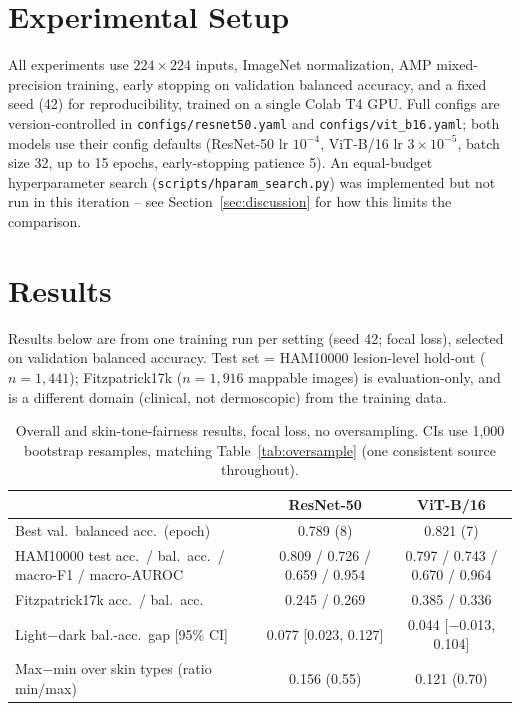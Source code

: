 \documentclass[twoside,a4paper,11pt]{article}
\begin{document}
\section{Experimental Setup}
\label{sec:setup}

All experiments use $224\times224$ inputs, ImageNet normalization,
AMP mixed-precision training, early stopping on validation balanced
accuracy, and a fixed seed (42) for reproducibility, trained on a
single Colab T4 GPU. Full configs are version-controlled in
\texttt{configs/resnet50.yaml} and \texttt{configs/vit\_b16.yaml}; both
models use their config defaults (ResNet-50 lr $10^{-4}$, ViT-B/16 lr
$3\times10^{-5}$, batch size 32, up to 15 epochs, early-stopping
patience 5). An equal-budget hyperparameter search
(\texttt{scripts/hparam\_search.py}) was implemented but not run in
this iteration -- see Section~\ref{sec:discussion} for how this limits
the comparison.

\section{Results}
\label{sec:results}

Results below are from one training run per setting (seed 42; focal
loss), selected on validation balanced accuracy. Test set = HAM10000
lesion-level hold-out ($n=1{,}441$); Fitzpatrick17k ($n=1{,}916$
mappable images) is evaluation-only, and is a different domain
(clinical, not dermoscopic) from the training data.

\begin{table}[h]
\centering
\begin{tabular}{lcc}
\toprule
 & ResNet-50 & ViT-B/16 \\
\midrule
Best val.\ balanced acc.\ (epoch) & 0.789 (8) & 0.821 (7) \\
HAM10000 test acc.\ / bal.\ acc.\ / macro-F1 / macro-AUROC & 0.809 / 0.726 / 0.659 / 0.954 & 0.797 / 0.743 / 0.670 / 0.964 \\
Fitzpatrick17k acc.\ / bal.\ acc.\ & 0.245 / 0.269 & 0.385 / 0.336 \\
Light$-$dark bal.-acc.\ gap [95\% CI] & 0.077 [0.023, 0.127] & 0.044 [$-$0.013, 0.104] \\
Max$-$min over skin types (ratio min/max) & 0.156 (0.55) & 0.121 (0.70) \\
\bottomrule
\end{tabular}
\caption{Overall and skin-tone-fairness results, focal loss, no
oversampling. CIs use 1{,}000 bootstrap resamples, matching
Table~\ref{tab:oversample} (one consistent source throughout).}
\label{tab:main}
\end{table}
\end{document}
